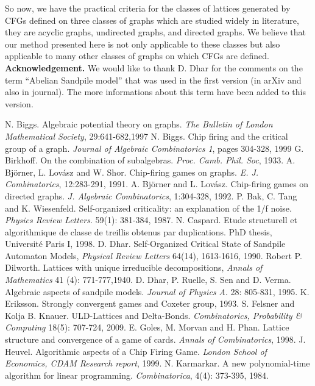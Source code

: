 \documentclass{article}
\theoremstyle{definition}
\begin{document}
So now, we have the practical criteria for the classes of lattices generated by CFGs defined on three classes of graphs which are studied widely in literature, they are acyclic graphs, undirected graphs, and directed graphs. We believe that our method presented here is not only applicable to these classes but also applicable to many other classes of graphs on which CFGs are defined.
\text{}\\

\textbf{Acknowledgement.} We would like to thank D. Dhar for the comments on the term ``Abelian Sandpile model'' that was used in the first version (in arXiv and also in journal). The more informations about  this term have been added to this version.
\pagebreak
\begin{thebibliography}{9}
 N. Biggs. Algebraic potential theory on graphs. \emph{The Bulletin of London Mathematical Society}, 29:641-682,1997
 N. Biggs. Chip firing and the critical group of a graph. \emph{Journal of Algebraic Combinatorics 1}, pages 304-328, 1999
 G. Birkhoff. On the combination of subalgebras. \emph{Proc. Camb. Phil. Soc}, 1933.
 A. Bj\"orner, L. Lov\'asz and W. Shor. Chip-firing games on graphs. \emph{E. J. Combinatorics}, 12:283-291, 1991.
 A. Bj\"orner and L. Lov\'asz. Chip-firing games on directed graphs. \emph{J. Algebraic Combinatorics}, 1:304-328, 1992.
 P. Bak, C. Tang and K. Wiesenfeld.  Self-organized criticality: an explanation of the 1/f noise. \emph{Physics Review Letters}. 59(1): 381-384, 1987.
 N. Caspard. Etude structurell et algorithmique de classe de treillis obtenus par duplications. PhD thesis, Universit\'e Paris I, 1998.
 D. Dhar. Self-Organized Critical State of Sandpile Automaton Models, \emph{Physical Review Letters} 64(14), 1613-1616, 1990.
 Robert P. Dilworth. Lattices with unique irreducible decompositions, \emph{Annals of Mathematics} 41 (4): 771-777,1940.
 D. Dhar, P. Ruelle, S. Sen and D. Verma. Algebraic aspects of sandpile models. \emph{Journal of {P}hysics A}. 28: 805-831, 1995.
 K. Eriksson. Strongly convergent games and Coxeter group, 1993.
 S. Felsner and Kolja B. Knauer. ULD-Lattices and Delta-Bonds. \emph{Combinatorics, Probability \& Computing} 18(5): 707-724, 2009.
 E. Goles, M. Morvan and H. Phan. Lattice structure and convergence of a game of cards. \emph{Annals of Combinatorics}, 1998.
 J. Heuvel. Algorithmic aspects of a Chip Firing Game. \emph{London School of Economics, CDAM Research report}, 1999.
 N. Karmarkar. A new polynomial-time algorithm for linear programming. \emph{Combinatorica}, 4(4): 373-395, 1984.


\end{thebibliography}
\end{document}
